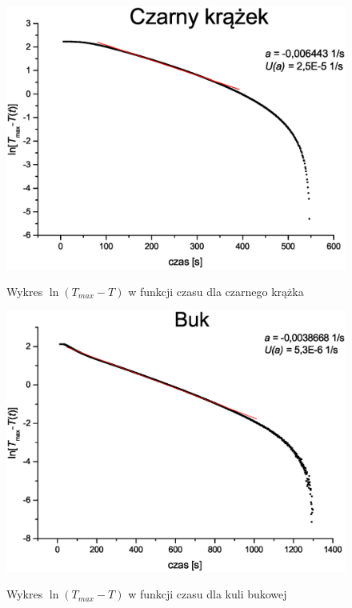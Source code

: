 \documentclass[11pt]{article}
\begin{document}
\begin{figure}[h!]
\begin{center}
\includegraphics[height=0.4\textheight]{kronzekg.eps}
\caption{Wykres $\ln (T_{max} - T)$ w funkcji czasu dla czarnego krążka}{\label{WYK_CZK}}
\end{center}
\end{figure}

\begin{figure}[h!]
\begin{center}
\includegraphics[height=0.4\textheight]{bukg.eps}
\caption{Wykres $\ln (T_{max} - T)$ w funkcji czasu dla kuli bukowej}{\label{WYK_BRAZ}}
\end{center}
\end{figure}
\end{document}
